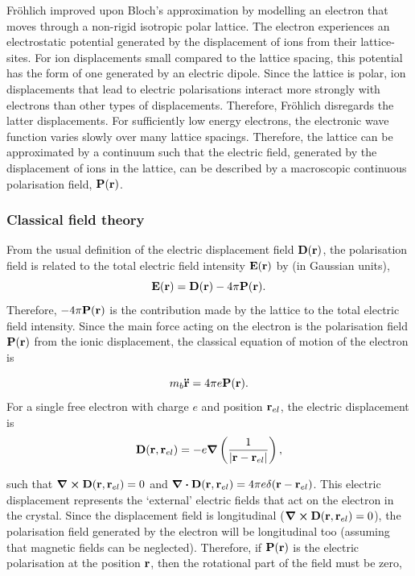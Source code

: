 Fr\"ohlich improved upon Bloch's approximation by modelling an electron that moves through a non-rigid isotropic polar lattice. The electron experiences an electrostatic potential generated by the displacement of ions from their lattice-sites. For ion displacements small compared to the lattice spacing, this potential has the form of one generated by an electric dipole. Since the lattice is polar, ion displacements that lead to electric polarisations interact more strongly with electrons than other types of displacements. Therefore, Fr\"ohlich disregards the latter displacements. For sufficiently low energy electrons, the electronic wave function varies slowly over many lattice spacings. Therefore, the lattice can be approximated by a continuum such that the electric field, generated by the displacement of ions in the lattice, can be described by a macroscopic continuous polarisation field, $\vb{P}(\vb{r})$. 

\subsubsection{Classical field theory}
\label{subsubsec:2-1-2-1}

From the usual definition of the electric displacement field $\vb{D}(\vb{r})$, the polarisation field is related to the total electric field intensity $\vb{E}(\vb{r})$ by (in Gaussian units),
\begin{equation}
    \vb{E}(\vb{r}) = \vb{D}(\vb{r}) - 4\pi\vb{P}(\vb{r}).
\end{equation}
Therefore, $-4\pi\vb{P}(\vb{r})$ is the contribution made by the lattice to the total electric field intensity. Since the main force acting on the electron is the polarisation field $\vb{P}(\vb{r})$ from the ionic displacement, the classical equation of motion of the electron is

\begin{equation}
    m_b \vb{\ddot{r}} = 4\pi e \vb{P}(\vb{r}).
\end{equation}
For a single free electron with charge $e$ and position $\vb{r}_{el}$, the electric displacement is
\begin{equation}
    \vb{D}(\vb{r}, \vb{r}_{el}) = -e \grad \left(\frac{1}{\abs{\vb{r} - \vb{r}_{el}}}\right),
\end{equation}

such that $\curl \vb{D}(\vb{r}, \vb{r}_{el}) = 0$ and $\div \vb{D}(\vb{r}, \vb{r}_{el}) = 4\pi e \delta (\vb{r} - \vb{r}_{el})$. This electric displacement represents the `external' electric fields that act on the electron in the crystal. Since the displacement field is longitudinal ($\curl \vb{D}(\vb{r}, \vb{r}_{el}) = 0$), the polarisation field generated by the electron will be longitudinal too (assuming that magnetic fields can be neglected). Therefore, if $\vb{P}(\vb{r})$ is the electric polarisation at the position $\vb{r}$, then the rotational part of the field must be zero,

